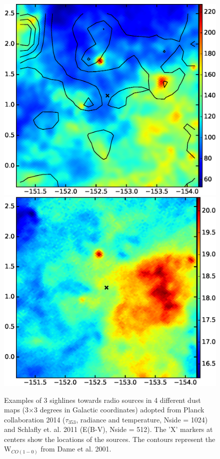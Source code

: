 \documentclass[preprint]{emulateapj}
\begin{document}
\begin{figure}[h!]
\includegraphics[scale=0.21]{fig/src_eg_apd0_r2c2.eps}
\includegraphics[scale=0.21]{fig/src_eg_apd0_r2c3.eps}
%
\caption{Examples of 3 sighlines towards radio sources in 4 different dust maps (3$\times$3 degrees in Galactic coordinates) adopted from Planck collaboration 2014 ($\tau_{353}$, radiance and temperature, Nside = 1024) and Schlafly et. al. 2011 (E(B-V), Nside = 512). The 'X' markers at centers show the locations of the sources. The contours represent the W$_{CO(1-0)}$ from Dame et al. 2001.}
\label{fig:apd0}
\end{figure}
\end{document}
